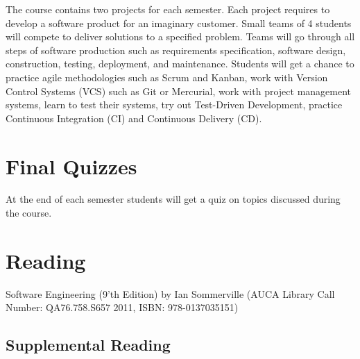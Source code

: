 \documentclass[12pt,a4paper,oneside]{article}
\begin{document}
        The course contains two projects for each semester. Each project
        requires to develop a software product for an imaginary customer. Small
        teams of 4 students will compete to deliver solutions to a specified
        problem. Teams will go through all steps of software production such as
        requirements specification, software design, construction, testing,
        deployment, and maintenance. Students will get a chance to practice
        agile methodologies such as Scrum and Kanban, work with Version Control
        Systems (VCS) such as Git or Mercurial, work with project management
        systems, learn to test their systems, try out Test-Driven Development,
        practice Continuous Integration (CI) and Continuous Delivery (CD).

    \section{Final Quizzes}

        At the end of each semester students will get a quiz on topics discussed
        during the course.

    \section{Reading}

        Software Engineering (9'th Edition) by Ian Sommerville (AUCA Library
        Call Number: QA76.758.S657 2011, ISBN: 978-0137035151)

            \subsection{Supplemental Reading}
\end{document}
